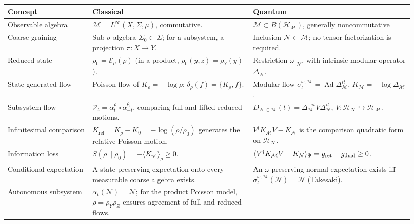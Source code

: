 \documentclass[a4paper,11pt]{article}
\theoremstyle{definition}
\newcommand{\mN}{\mathcal{N}}
\newcommand{\mH}{\mathcal{H}}
\newcommand{\mM}{\mathcal{M}}
\newcommand{\mE}{\mathcal{E}}
\begin{document}
\begin{table}[htbp]
\centering
\label{tab:classical-quantum-dictionary}
\begingroup
\footnotesize
\setlength{\tabcolsep}{4pt}
\renewcommand{\arraystretch}{1.22}
\begin{tabular}{@{}>{\raggedright\arraybackslash}p{0.19\linewidth}
                >{\raggedright\arraybackslash}p{0.365\linewidth}
                >{\raggedright\arraybackslash}p{0.365\linewidth}@{}}
\toprule
\textbf{Concept} & \textbf{Classical} & \textbf{Quantum} \\
\midrule
Observable algebra &
$\mM=L^\infty(X,\Sigma,\mu)$, commutative. &
$\mM\subset B(\mH_{\mM})$, generally noncommutative \\
\addlinespace[2pt]
Coarse-graining &
Sub-$\sigma$-algebra $\Sigma_0\subset\Sigma$; for a subsystem, a projection $\pi:X\to Y$. &
Inclusion $\mN\subset\mM$; no tensor factorization is required. \\
\addlinespace[2pt]
Reduced state &
$\rho_0=\mE_\mu(\rho)$ (in a product, $\rho_0(y,z)=\rho_Y(y)$). &
Restriction $\omega|_{\mN}$, with intrinsic modular operator $\Delta_{\mN}$. \\
\addlinespace[2pt]
State-generated flow &
Poisson flow of $K_\rho=-\log\rho$:
$\delta_\rho(f)=\{K_\rho,f\}$. &
Modular flow $\sigma_t^{\omega;\mM}=\operatorname{Ad}\Delta_{\mM}^{it}$,
$K_{\mM}=-\log\Delta_{\mM}$. \\
\addlinespace[2pt]
Subsystem flow &
$\mathcal V_t=\alpha_t^\rho\circ\alpha_{-t}^{\rho_0}$,
comparing full and lifted reduced motions. &
$D_{\mN\subset\mM}(t)=\Delta_{\mM}^{-it}V\Delta_{\mN}^{it}$,
$V:\mH_{\mN}\hookrightarrow\mH_{\mM}$. \\
\addlinespace[2pt]
Infinitesimal comparison &
$K_{\mathrm{rel}}=K_\rho-K_0
=-\log(\rho/\rho_0)$ generates the relative Poisson motion. &
$V^\dagger K_{\mM}V-K_{\mN}$ is the comparison quadratic form on $\mH_{\mN}$. \\
\addlinespace[2pt]
Information loss &
$S(\rho\|\rho_0)=-\langle K_{\mathrm{rel}}\rangle_\rho\ge0$. &
$\langle V^\dagger K_{\mM}V-K_{\mN}\rangle_\Psi
=g_{\rm ret}+g_{\rm dual}\ge0$. \\
\addlinespace[2pt]
Conditional expectation &
A state-preserving expectation onto every measurable coarse algebra exists. &
An $\omega$-preserving normal expectation exists iff
$\sigma_t^{\omega;\mM}(\mN)=\mN$ (Takesaki). \\
\addlinespace[2pt]
Autonomous subsystem &
$\alpha_t(\mN)=\mN$;
for the product Poisson model, $\rho=\rho_Y\rho_Z$ ensures agreement of full and reduced flows. &

\end{tabular}
\end{table}
\end{document}
